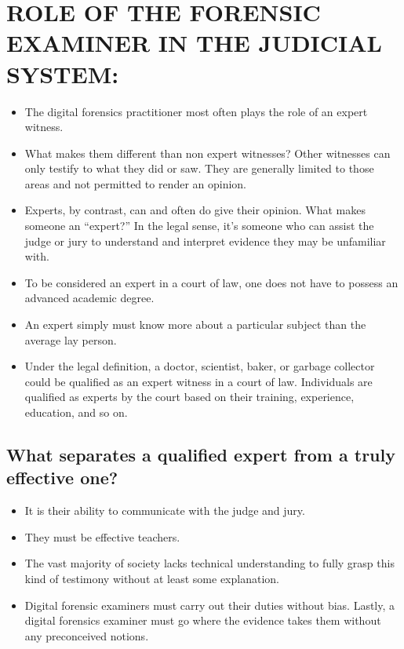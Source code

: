 \documentclass[10pt,british,english]{article}
\begin{document}
\section{ROLE OF THE FORENSIC EXAMINER IN THE JUDICIAL SYSTEM:}
\begin{itemize}
\item The digital forensics practitioner most often plays the role of an
expert witness.
\item What makes them different than non expert witnesses? Other witnesses
can only testify to what they did or saw. They are generally limited
to those areas and not permitted to render an opinion. 
\item Experts, by contrast, can and often do give their opinion. What makes
someone an \textquotedblleft expert?\textquotedblright{} In the legal
sense, it\textquoteright s someone who can assist the judge or jury
to understand and interpret evidence they may be unfamiliar with. 
\item To be considered an expert in a court of law, one does not have to
possess an advanced academic degree. 
\item An expert simply must know more about a particular subject than the
average lay person.
\item Under the legal definition, a doctor, scientist, baker, or garbage
collector could be qualified as an expert witness in a court of law.
Individuals are qualified as experts by the court based on their training,
experience, education, and so on.
\end{itemize}

\subsection{What separates a qualified expert from a truly effective one? }
\begin{itemize}
\item It is their ability to communicate with the judge and jury. 
\item They must be effective teachers. 
\item The vast majority of society lacks technical understanding to fully
grasp this kind of testimony without at least some explanation. 
\item Digital forensic examiners must carry out their duties without bias.
Lastly, a digital forensics examiner must go where the evidence takes
them without any preconceived notions.
\end{itemize}
\end{document}
